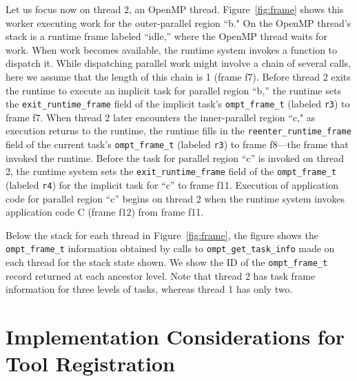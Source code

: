 \documentclass{article}
\begin{document}
{Let us focus now on thread 2, an OpenMP thread. Figure~\ref{fig:frame}  shows this worker executing  work for the outer-parallel region ``b."
On the OpenMP thread's stack is a runtime frame labeled ``idle,'' where the OpenMP thread waits for work. 
When work becomes available, the runtime system invokes a function to dispatch it. While dispatching parallel work might involve a chain of several calls, here we assume that the length of this chain is 1 (frame f7).  Before thread 2 exits the runtime to execute an implicit task for parallel region ``b,'' the runtime 
sets the \verb|exit_runtime_frame| field of the implicit task's \verb|ompt_frame_t| (labeled \verb|r3|) to frame f7. 
When thread 2 later encounters the inner-parallel region ``c,"  as execution returns to the runtime,  the runtime fills in the  \verb|reenter_runtime_frame| field of the current task's \verb|ompt_frame_t| (labeled \verb|r3|) to frame f8---the frame that invoked the runtime. Before the task for parallel region ``c'' is invoked on thread 2, the runtime system sets the \verb|exit_runtime_frame| field  of the \verb|ompt_frame_t| (labeled \verb|r4|) for the implicit task for ``c'' 
to frame f11. Execution of application code for parallel region ``c''  begins on thread 2  when the runtime system invokes application code C (frame f12) from frame f11.


Below the stack for each thread in Figure~\ref{fig:frame}, the figure shows the \verb|ompt_frame_t| information obtained by calls to \verb|ompt_get_task_info| made on each thread for the stack state shown. We show the ID of the \verb|ompt_frame_t| record returned at each ancestor level. Note that thread 2 has task frame information for three levels of tasks, whereas thread 1 has only two.

\clearpage
\section{Implementation Considerations for Tool  Registration}
\label{app:registration} 

}
\end{document}
